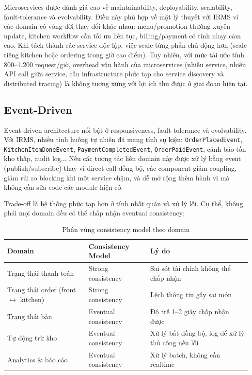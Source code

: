 Microservices được đánh giá cao về maintainability, deployability, scalability, fault-tolerance và evolvability. Điều này phù hợp về mặt lý thuyết với IRMS vì các domain có vòng đời thay đổi khác nhau: menu/promotion thường xuyên update, kitchen workflow cần tối ưu liên tục, billing/payment có tính nhạy cảm cao. Khi tách thành các service độc lập, việc scale từng phần chủ động hơn (scale riêng kitchen hoặc ordering trong giờ cao điểm). Tuy nhiên, với mức tải ước tính 800--1.200 request/giờ, overhead vận hành của microservices (nhiều service, nhiều API call giữa service, cần infrastructure phức tạp cho service discovery và distributed tracing) là không tương xứng với lợi ích thu được ở giai đoạn hiện tại.
 
\subsection{Event-Driven}
 
Event-driven architecture nổi bật ở responsiveness, fault-tolerance và evolvability. Với IRMS, nhiều tình huống tự nhiên đã mang tính sự kiện: \texttt{OrderPlacedEvent}, \texttt{KitchenItemDoneEvent}, \texttt{PaymentCompletedEvent}, \texttt{OrderPaidEvent}, cảnh báo tồn kho thấp, audit log... Nếu các tương tác liên domain này được xử lý bằng event (publish/subscribe) thay vì direct call đồng bộ, các component giảm coupling, giảm rủi ro blocking khi một service chậm, và dễ mở rộng thêm hành vi mà không cần sửa code các module hiện có.
 
Trade-off là hệ thống phức tạp hơn ở tính nhất quán và xử lý lỗi. Cụ thể, không phải mọi domain đều có thể chấp nhận eventual consistency:
 
\begin{table}[h!]
\centering
\caption{Phân vùng consistency model theo domain}
\begin{tabular}{|l|l|p{5cm}|}
\hline
\textbf{Domain} & \textbf{Consistency Model} & \textbf{Lý do} \\
\hline
Trạng thái thanh toán & Strong consistency & Sai sót tài chính không thể chấp nhận \\
\hline
Trạng thái order (front $\leftrightarrow$ kitchen) & Strong consistency & Lệch thông tin gây sai món \\
\hline
Trạng thái bàn & Eventual consistency & Độ trễ 1--2 giây chấp nhận được \\
\hline
Tự động trừ kho & Eventual consistency & Xử lý bất đồng bộ, log để xử lý thủ công nếu lỗi \\
\hline
Analytics \& báo cáo & Eventual consistency & Xử lý batch, không cần realtime \\
\hline
\end{tabular}
\end{table}
 
